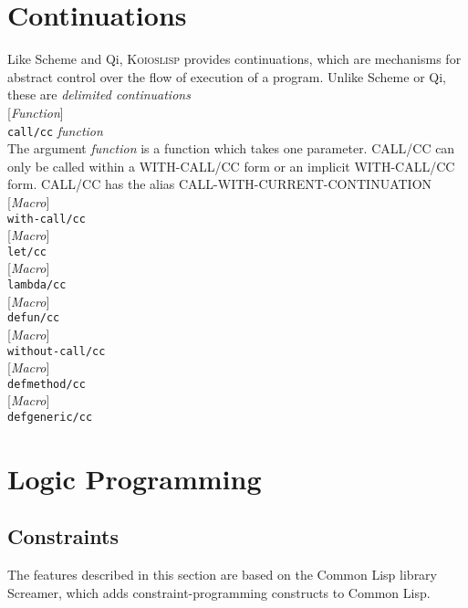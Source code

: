 \documentclass[10pt]{book}
\newenvironment{defother}[2]{[\textit{#1}]\\\texttt{#2}}{\\}
\newenvironment{defun}[1]{\begin{defother}{Function}{#1}}{\end{defother}}
\newenvironment{defmacro}[1]{\begin{defother}{Macro}{#1}}{\end{defother}}
\begin{document}
\chapter{Continuations}
Like Scheme and Qi, \textsc{Koioslisp} provides continuations, which are mechanisms for abstract control over the flow of execution of a program. Unlike Scheme or Qi, these are \textit{delimited continuations}\\

\begin{defun}{call/cc} \textit{function}\\
The argument \textit{function} is a function which takes one parameter. CALL/CC can only be called within a WITH-CALL/CC form or an implicit WITH-CALL/CC form. CALL/CC has the alias CALL-WITH-CURRENT-CONTINUATION\end{defun}
\begin{defmacro}{with-call/cc} \end{defmacro}
\begin{defmacro}{let/cc}\end{defmacro}
\begin{defmacro}{lambda/cc}\end{defmacro}
\begin{defmacro}{defun/cc}\end{defmacro}
\begin{defmacro}{without-call/cc}\end{defmacro}
\begin{defmacro}{defmethod/cc}\end{defmacro} %
\begin{defmacro}{defgeneric/cc}\end{defmacro} 
\chapter{Logic Programming}
\section{Constraints}
The features described in this section are based on the Common Lisp library Screamer, which adds constraint-programming constructs to Common Lisp.
\end{document}
